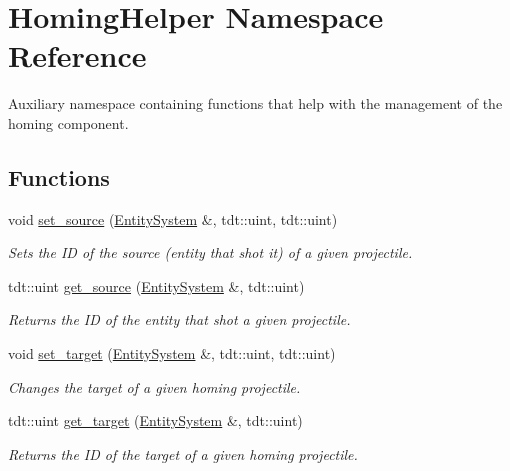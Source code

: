\hypertarget{namespace_homing_helper}{}\section{Homing\+Helper Namespace Reference}
\label{namespace_homing_helper}


Auxiliary namespace containing functions that help with the management of the homing component.  


\subsection*{Functions}
\begin{DoxyCompactItemize}
\item 
void \hyperlink{namespace_homing_helper_aced9fcb69f01dbe8c8ff01d8a5647d51}{set\+\_\+source} (\hyperlink{class_entity_system}{Entity\+System} \&, tdt\+::uint, tdt\+::uint)
\begin{DoxyCompactList}\small\item\em Sets the ID of the source (entity that shot it) of a given projectile. \end{DoxyCompactList}\item 
tdt\+::uint \hyperlink{namespace_homing_helper_a7bbf067883eeabe3824c811b3624a66c}{get\+\_\+source} (\hyperlink{class_entity_system}{Entity\+System} \&, tdt\+::uint)
\begin{DoxyCompactList}\small\item\em Returns the ID of the entity that shot a given projectile. \end{DoxyCompactList}\item 
void \hyperlink{namespace_homing_helper_ace08a9c98a75575c38b366c5ee009b9c}{set\+\_\+target} (\hyperlink{class_entity_system}{Entity\+System} \&, tdt\+::uint, tdt\+::uint)
\begin{DoxyCompactList}\small\item\em Changes the target of a given homing projectile. \end{DoxyCompactList}\item 
tdt\+::uint \hyperlink{namespace_homing_helper_a1810438ee55ead125b2f97d38abfbe98}{get\+\_\+target} (\hyperlink{class_entity_system}{Entity\+System} \&, tdt\+::uint)
\begin{DoxyCompactList}\small\item\em Returns the ID of the target of a given homing projectile. \end{DoxyCompactList}\item 

\end{DoxyCompactItemize}
